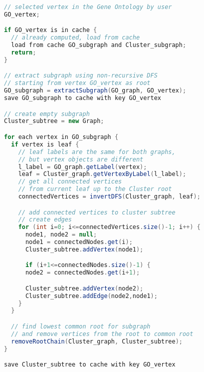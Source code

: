 \label{sec:appendix_B}

\begin{center}
\small
\begin{lstlisting}[language=Java]
// selected vertex in the Gene Ontology by user
GO_vertex;

if GO_vertex is in cache {
  // already computed, load from cache
  load from cache GO_subgraph and Cluster_subgraph;
  return;
}

// extract subgraph using non-recursive DFS
// starting from vertex GO_vertex as root
GO_subgraph = extractSubgraph(GO_graph, GO_vertex);
save GO_subgraph to cache with key GO_vertex

// create empty subgraph
Cluster_subtree = new Graph;

for each vertex in GO_subgraph {
  if vertex is leaf {
    // leaf labels are the same for both graphs,
    // but vertex objects are different
    l_label = GO_graph.getLabel(vertex);
    leaf = Cluster_graph.getVertexByLabel(l_label);
    // get all connected vertices
    // from current leaf up to the Cluster root
    connectedVertices = invertDFS(Cluster_graph, leaf);

    // add connected vertices to cluster subtree
    // create edges
    for (int i=0; i<=connectedVertices.size()-1; i++) {
      node1, node2 = null;
      node1 = connectedNodes.get(i);
      Cluster_subtree.addVertex(node1);

      if (i+1<=connectedNodes.size()-1) {
      node2 = connectedNodes.get(i+1);

      Cluster_subtree.addVertex(node2);
      Cluster_subtree.addEdge(node2,node1);
    }
  }

  // find lowest common root for subgraph
  // and remove vertices from the root to common root
  removeRootChain(Cluster_graph, Cluster_subtree);
}

save Cluster_subtree to cache with key GO_vertex
\end{lstlisting}
\end{center}
